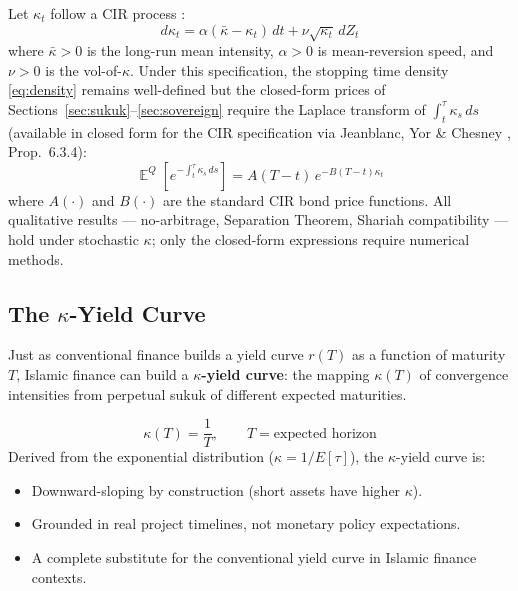 \documentclass[10pt,twocolumn]{article}
\theoremstyle{plain}
\theoremstyle{definition}
\DeclareMathOperator{\E}{\mathbb{E}}
\begin{document}
Let $\kappa_t$ follow a CIR process \cite{CIR1985}:
\begin{equation}
d\kappa_t = \alpha(\bar\kappa - \kappa_t)\,dt + \nu\sqrt{\kappa_t}\,dZ_t
\label{eq:kappa_cir}
\end{equation}
where $\bar\kappa > 0$ is the long-run mean intensity, $\alpha > 0$
is mean-reversion speed, and $\nu > 0$ is the vol-of-$\kappa$.
Under this specification, the stopping time density
\eqref{eq:density} remains well-defined but the closed-form prices
of Sections~\ref{sec:sukuk}--\ref{sec:sovereign} require the
Laplace transform of $\int_t^\tau \kappa_s\,ds$ (available in
closed form for the CIR specification via Jeanblanc, Yor \&
Chesney \cite{JeanblanYorChesney2009}, Prop.\ 6.3.4):
\begin{equation}
\E^Q\!\left[e^{-\int_t^\tau \kappa_s\,ds}\right]
= A(T-t)\,e^{-B(T-t)\kappa_t}
\label{eq:cir_laplace}
\end{equation}
where $A(\cdot)$ and $B(\cdot)$ are the standard CIR bond price
functions. All qualitative results --- no-arbitrage, Separation
Theorem, Shariah compatibility --- hold under stochastic $\kappa$;
only the closed-form expressions require numerical methods.

\subsection{The $\kappa$-Yield Curve}

Just as conventional finance builds a yield curve $r(T)$ as a
function of maturity $T$, Islamic finance can build a
\textbf{$\kappa$-yield curve}: the mapping $\kappa(T)$ of
convergence intensities from perpetual sukuk of different
expected maturities.

\begin{equation}
\kappa(T) = \frac{1}{T}, \qquad T = \text{expected horizon}
\label{eq:kappa_curve}
\end{equation}
Derived from the exponential distribution ($\kappa = 1/E[\tau]$),
the $\kappa$-yield curve is:
\begin{itemize}[leftmargin=*,noitemsep]
\item Downward-sloping by construction (short assets have higher $\kappa$).
\item Grounded in real project timelines, not monetary policy expectations.
\item A complete substitute for the conventional yield curve in Islamic
finance contexts.
\end{itemize}
\end{document}
